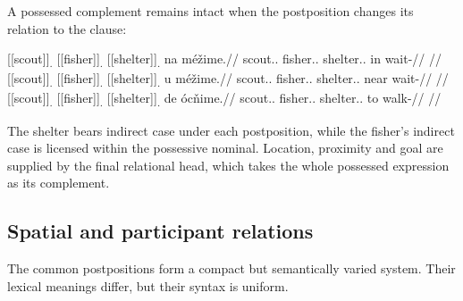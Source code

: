A possessed complement remains intact when the postposition changes its
relation to the clause:

\pex\label{ex:nm-slot-pp-complement}
\a
\begingl
\gla \textnormal{[[scout]]}\textsubscript{\Dir{}.\Sg{}} \textnormal{[[fisher]]}\textsubscript{\Ind{}.\Sg{}} \textnormal{[[shelter]]}\textsubscript{\Ind{}.\Sg{}} na méžime.//
\glb scout.\Dir{}.\Sg{} fisher.\Ind{}.\Sg{} shelter.\Ind{}.\Sg{} in wait-\Prog{}//
\glft {} //
\endgl
\a
\begingl
\gla \textnormal{[[scout]]}\textsubscript{\Dir{}.\Sg{}} \textnormal{[[fisher]]}\textsubscript{\Ind{}.\Sg{}} \textnormal{[[shelter]]}\textsubscript{\Ind{}.\Sg{}} u méžime.//
\glb scout.\Dir{}.\Sg{} fisher.\Ind{}.\Sg{} shelter.\Ind{}.\Sg{} near wait-\Prog{}//
\glft {} //
\endgl
\a
\begingl
\gla \textnormal{[[scout]]}\textsubscript{\Dir{}.\Sg{}} \textnormal{[[fisher]]}\textsubscript{\Ind{}.\Sg{}} \textnormal{[[shelter]]}\textsubscript{\Ind{}.\Sg{}} de ócňime.//
\glb scout.\Dir{}.\Sg{} fisher.\Ind{}.\Sg{} shelter.\Ind{}.\Sg{} to walk-\Prog{}//
\glft {} //
\endgl
\xe

The shelter bears indirect case under each postposition, while the
fisher's indirect case is licensed within the possessive nominal. Location,
proximity and goal are supplied by the final relational head, which takes
the whole possessed expression as its complement.

\subsection{Spatial and participant relations}
\label{sec:nm-postp-classes}
\label{sec:nm-postp-extended}

The common postpositions form a compact but semantically varied system. Their
lexical meanings differ, but their syntax is uniform.

